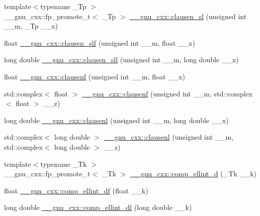 \begin{DoxyCompactItemize}
\item 
{\footnotesize template$<$typename \+\_\+\+Tp $>$ }\\\+\_\+\+\_\+gnu\+\_\+cxx\+::fp\+\_\+promote\+\_\+t$<$ \+\_\+\+Tp $>$ \hyperlink{group__gnu__math__spec__func_gacb757b00309213cd96bb2bc6b5dc3c24}{\+\_\+\+\_\+gnu\+\_\+cxx\+::clausen\+\_\+sl} (unsigned int \+\_\+\+\_\+m, \+\_\+\+Tp \+\_\+\+\_\+x)
\item 
float \hyperlink{group__gnu__math__spec__func_gadd92821afcbfbdc79496b091b12a357f}{\+\_\+\+\_\+gnu\+\_\+cxx\+::clausen\+\_\+slf} (unsigned int \+\_\+\+\_\+m, float \+\_\+\+\_\+x)
\item 
long double \hyperlink{group__gnu__math__spec__func_ga227d105b4c0659c4402de7217bb9b65b}{\+\_\+\+\_\+gnu\+\_\+cxx\+::clausen\+\_\+sll} (unsigned int \+\_\+\+\_\+m, long double \+\_\+\+\_\+x)
\item 
float \hyperlink{group__gnu__math__spec__func_ga6422bdec1a3c930fb1623094cd2eaff2}{\+\_\+\+\_\+gnu\+\_\+cxx\+::clausenf} (unsigned int \+\_\+\+\_\+m, float \+\_\+\+\_\+x)
\item 
std\+::complex$<$ float $>$ \hyperlink{group__gnu__math__spec__func_ga98b5ba1e5de4ef2e0e9422ac8d9ce2ad}{\+\_\+\+\_\+gnu\+\_\+cxx\+::clausenf} (unsigned int \+\_\+\+\_\+m, std\+::complex$<$ float $>$ \+\_\+\+\_\+z)
\item 
long double \hyperlink{group__gnu__math__spec__func_ga33132bab39c8d78dde807b45fc06de52}{\+\_\+\+\_\+gnu\+\_\+cxx\+::clausenl} (unsigned int \+\_\+\+\_\+m, long double \+\_\+\+\_\+x)
\item 
std\+::complex$<$ long double $>$ \hyperlink{group__gnu__math__spec__func_gae39368808280f5c1b80dce7c2f4a67a7}{\+\_\+\+\_\+gnu\+\_\+cxx\+::clausenl} (unsigned int \+\_\+\+\_\+m, std\+::complex$<$ long double $>$ \+\_\+\+\_\+z)
\item 
{\footnotesize template$<$typename \+\_\+\+Tk $>$ }\\\+\_\+\+\_\+gnu\+\_\+cxx\+::fp\+\_\+promote\+\_\+t$<$ \+\_\+\+Tk $>$ \hyperlink{group__gnu__math__spec__func_ga3fe79a91524b43ffc5ffb83c0eb2bd00}{\+\_\+\+\_\+gnu\+\_\+cxx\+::comp\+\_\+ellint\+\_\+d} (\+\_\+\+Tk \+\_\+\+\_\+k)
\item 
float \hyperlink{group__gnu__math__spec__func_ga34ac6488b0e7531d5d4b7a8e31ff864e}{\+\_\+\+\_\+gnu\+\_\+cxx\+::comp\+\_\+ellint\+\_\+df} (float \+\_\+\+\_\+k)
\item 
long double \hyperlink{group__gnu__math__spec__func_ga494931ec0a271b79f1fdcfdf929e3138}{\+\_\+\+\_\+gnu\+\_\+cxx\+::comp\+\_\+ellint\+\_\+dl} (long double \+\_\+\+\_\+k)

\end{DoxyCompactItemize}
